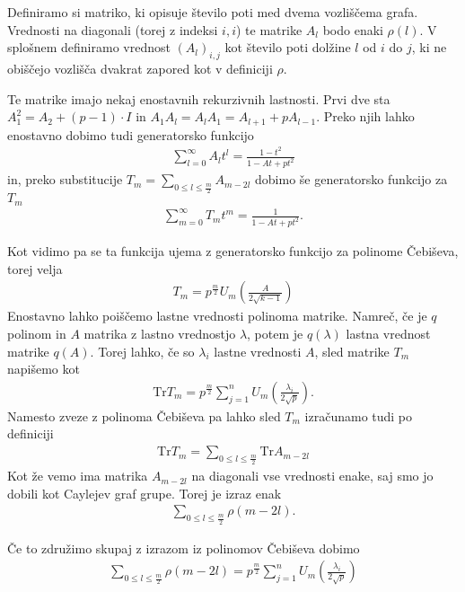 \begin{dokaz}
    Definiramo si matriko, ki opisuje število poti med dvema vozliščema grafa. Vrednosti na diagonali (torej z indeksi \(i, i\)) te matrike \(A_l\) bodo enaki \(\rho(l)\). V splošnem definiramo vrednost \((A_l)_{i,j}\) kot število poti dolžine \(l\) od \(i\) do \(j\), ki ne obiščejo vozlišča dvakrat zapored kot v definiciji \(\rho\).

    Te matrike imajo nekaj enostavnih rekurzivnih lastnosti. Prvi dve sta \(A_1^2 = A_2 + (p-1)\cdot I\) in \(A_1 A_l = A_lA_1 = A_{l+1}+pA_{l-1}\). Preko njih lahko enostavno dobimo tudi generatorsko funkcijo
    \begin{align*}
        \sum_{l=0}^\infty A_lt^l = \frac{1-t^2}{1-At+pt^2}
    \end{align*}
    in, preko substitucije \(T_m = \sum_{0\leq l \leq \frac{m}{2}} A_{m-2l}\) dobimo še generatorsko funkcijo za \(T_m\)
    \begin{align*}
        \sum_{m=0}^\infty T_m t^m = \frac{1}{1-At+pt^2}.
    \end{align*}

    Kot vidimo pa se ta funkcija ujema z generatorsko funkcijo za polinome Čebiševa, torej velja
    \begin{align*}
        T_m = p^{\frac{m}{2}} U_m\left(\frac{A}{2\sqrt{k-1}}\right)
    \end{align*}
    Enostavno lahko poiščemo lastne vrednosti polinoma matrike. Namreč, če je \(q\) polinom in \(A\) matrika z lastno vrednostjo \(\lambda\), potem je \(q(\lambda)\) lastna vrednost matrike \(q(A)\). Torej lahko, če so \(\lambda_i\) lastne vrednosti \(A\), sled matrike \(T_m\) napišemo kot
    \begin{align*}
        \mathrm{Tr} T_m = p^{\frac{m}{2}}\sum_{j=1}^n U_m \left(\frac{\lambda_i}{2\sqrt{p}}\right).
    \end{align*}
    Namesto zveze z polinoma Čebiševa pa lahko sled \(T_m\) izračunamo tudi po definiciji
    \begin{align*}
        \mathrm{Tr} T_m = \sum_{0\leq l\leq \frac{m}{2}} \mathrm{Tr} A_{m-2l}
    \end{align*}
    Kot že vemo ima matrika \(A_{m-2l}\) na diagonali vse vrednosti enake, saj smo jo dobili kot Caylejev graf grupe. Torej je izraz enak
    \begin{align*}
        \sum_{0\leq l\leq \frac{m}{2}} \rho(m-2l).
    \end{align*}

    Če to združimo skupaj z izrazom iz polinomov Čebiševa dobimo
    \begin{align*}
        \sum_{0\leq l\leq \frac{m}{2}} \rho(m-2l) = p^{\frac{m}{2}}\sum_{j=1}^n U_m \left(\frac{\lambda_i}{2\sqrt{p}}\right)
    \end{align*}
\end{dokaz}

